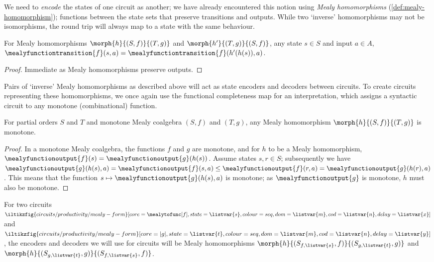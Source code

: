 We need to \emph{encode} the states of one circuit as another; we have already
encountered this notion using \emph{Mealy homomorphisms}
(\cref{def:mealy-homomorphism});
functions between the state sets that preserve transitions and outputs.
While two `inverse' homomorphisms may not be isomorphisms, the round
trip will always map to a state with the same behaviour.

\begin{lemma}
    For Mealy homomorphisms \(\morph{h}{(S,f)}{(T,g)}\) and
    \(\morph{h^\prime}{(T,g)}{(S,f)}\), any state \(s \in S\) and input
    \(a \in A\), \(
    \mealyfunctiontransition{f}(s, a)
    =
    \mealyfunctiontransition{f}(h^\prime(h(s)), a)
    \).
\end{lemma}
\begin{proof}
    Immediate as Mealy homomorphisms preserve outputs.
\end{proof}

Pairs of `inverse' Mealy homomorphisms as described above will act as state
encoders and decoders between circuits.
To create circuits representing these homomorphisms, we once again use the
functional completeness map for an interpretation, which assigns a syntactic
circuit to any monotone (combinational) function.

\begin{lemma}
    For partial orders \(S\) and \(T\) and monotone Mealy coalgebra
    \((S,f)\) and \((T,g)\), any Mealy homomorphism \(\morph{h}{(S,f)}{(T,g)}\)
    is monotone.
\end{lemma}
\begin{proof}
    In a monotone Mealy coalgebra, the functions \(f\) and \(g\) are monotone,
    and for \(h\) to be a Mealy homomorphism, \(
    \mealyfunctionoutput{f}(s)
    =
    \mealyfunctionoutput{g}(h(s))
    \).
    Assume states \(s,r \in S\); subsequently we have \(
    \mealyfunctionoutput{g}(h(s), a)
    =
    \mealyfunctionoutput{f}(s, a)
    \leq
    \mealyfunctionoutput{f}(r, a)
    =
    \mealyfunctionoutput{g}(h(r), a)
    \).
    This means that the function \(
    s \mapsto \mealyfunctionoutput{g}(h(s), a)
    \) is monotone; as \(\mealyfunctionoutput{g}\) is monotone, \(h\) must
    also be monotone.
\end{proof}

For two circuits \(
\iltikzfig{circuits/productivity/mealy-form}[core=\mealytofunc[f],state=\listvar{s},colour=seq,dom=\listvar{m},cod=\listvar{n},delay=\listvar{x}]
\) and \(
\iltikzfig{circuits/productivity/mealy-form}[core=|g|,state=\listvar{t},colour=seq,dom=\listvar{m},cod=\listvar{n},delay=\listvar{y}]
\), the encoders and decoders we will use for circuits will be Mealy homomorphisms
\(\morph{h}{(S_{f,\listvar{s}},f)}{(S_{g,\listvar{t}},g)}\)
and
\(\morph{h}{(S_{g,\listvar{t}},g)}{(S_{f,\listvar{s}},f)}\).


